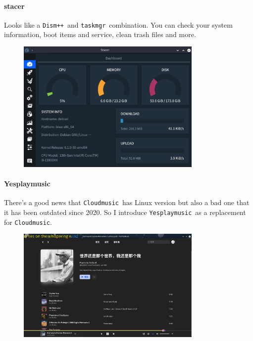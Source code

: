 \documentclass[12pt]{ctexart}
\begin{document}
\paragraph{\textbf{stacer}}

Looks like a \texttt{Dism++}\ and \texttt{taskmgr}\ combination. You can
check your system information, boot items and service, clean trash files
and more.

\begin{figure}[H]
    \centering
    \includegraphics[width=0.8\textwidth,keepaspectratio]{assets/Linux/3.2 Decorate your own garden/12.png}
\end{figure}

\paragraph{\textbf{Yesplaymusic}}

There's a good news that \texttt{Cloudmusic}\ has Linux
version but also a bad one that it has been outdated since 2020. So I
introduce \texttt{Yesplaymusic}\ as a replacement for
\texttt{Cloudmusic}.

\begin{figure}[H]
    \centering
    \includegraphics[width=0.8\textwidth,keepaspectratio]{assets/Linux/3.2 Decorate your own garden/13.png}
\end{figure}
\end{document}
